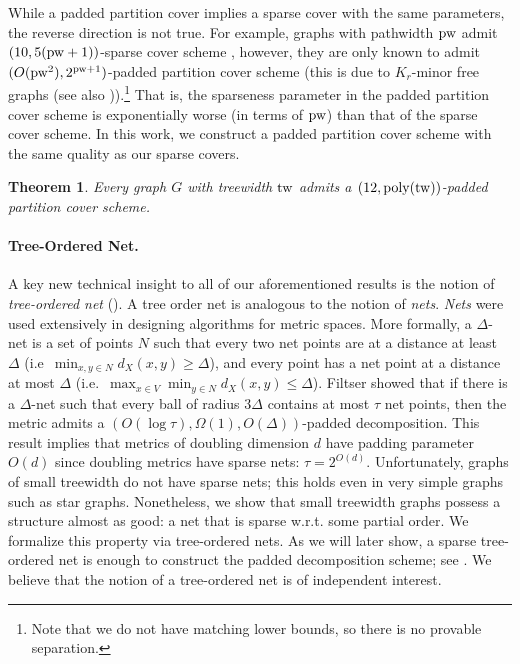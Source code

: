 \documentclass{article}
\newtheorem{theorem}{Theorem}\newtheorem{lemma}[theorem]{Lemma}\newtheorem{proposition}[theorem]{Proposition}\newtheorem{corollary}[theorem]{Corollary}\newtheorem{definition}[theorem]{Definition}\newtheorem{claim}[theorem]{Claim}\newtheorem{remark}[theorem]{Remark}\newtheorem{observation}[theorem]{Observation}\newtheorem{conjecture}[theorem]{Conjecture}\newtheorem{example}[theorem]{Example}
\newcommand{\tw}{{\rm tw}}
\newcommand{\pw}{{\rm pw}}
\newcommand{\poly}{\mathrm{poly}}
\begin{document}
While a padded partition cover implies a sparse cover with the same parameters, the reverse direction is not true. For example, graphs with pathwidth $\pw$ admit $(10,5(\pw+1))$-sparse cover scheme \cite{Fil20}, however, they are only known to admit  $(O(\pw^2),2^{\pw+1})$-padded partition cover scheme (this is due to $K_r$-minor free graphs \cite{KPR93,FT03} (see also \cite{KLMN04,Fil20})).\footnote{Note that we do not have matching lower bounds, so there is no provable separation.} That is, the sparseness parameter in the padded partition cover scheme is exponentially worse (in terms of $\pw$) than that of the sparse cover scheme. In this work, we construct a padded partition cover scheme with the same quality as our sparse covers.

\begin{theorem}\label{thm:PaddedPartitionCoverTW}
	Every graph $G$ with treewidth $\tw$ admits a  $\left(12,\poly(\tw)\right)$-padded partition cover scheme. 
\end{theorem}

\paragraph*{Tree-Ordered Net.} A key new technical insight to all of our aforementioned results is the notion of \emph{tree-ordered net} (). A tree order net is analogous to the notion of \emph{nets}. \emph{Nets} were used extensively in designing algorithms for metric spaces. More formally, a $\Delta$-net is a set of points $N$ such that every two net points are at a distance at least $\Delta$ (i.e~$\min_{x,y\in N}d_X(x,y)\ge\Delta$), and every point has a net point at a distance at most $\Delta$ (i.e.~$\max_{x\in V}\min_{y\in N}d_X(x,y)\le\Delta$). Filtser \cite{Fil19Approx} showed that if there is a $\Delta$-net such that every ball of radius $3\Delta$ contains at most $\tau$ net points, then the metric admits a $\left(O(\log\tau),\Omega(1),O(\Delta)\right)$-padded decomposition. This result implies that metrics of doubling dimension $d$  have padding parameter $O(d)$ since doubling metrics have sparse nets: $\tau = 2^{O(d)}$. Unfortunately, graphs of small treewidth do not have sparse nets; this holds even in very simple graphs such as star graphs. Nonetheless, we show that small treewidth graphs possess a structure almost as good: a net that is sparse w.r.t. some partial order. We formalize this property via tree-ordered nets.  As we will later show, a sparse tree-ordered net is enough to construct the padded decomposition scheme; see . We believe that the notion of a tree-ordered net is of independent interest.
\end{document}
